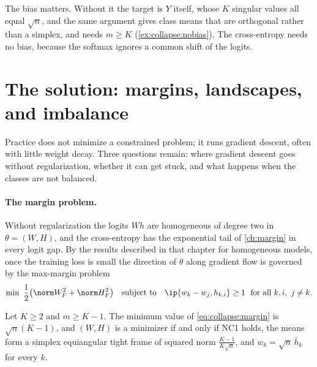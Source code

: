 \begin{refsection}
The bias matters. Without it the target is $Y$ itself, whose $K$ singular values all equal $\sqrt n$, and the same argument gives class means that are orthogonal rather than a simplex, and needs $m\ge K$ (\cref{ex:collapse:nobias}). The cross-entropy needs no bias, because the softmax ignores a common shift of the logits.

\section{The solution: margins, landscapes, and imbalance}\label{sec:collapse:dynamics}

Practice does not minimize a constrained problem; it runs gradient descent, often with little weight decay. Three questions remain: where gradient descent goes without regularization, whether it can get stuck, and what happens when the classes are not balanced.

\paragraph{The margin problem.} Without regularization the logits $Wh$ are homogeneous of degree two in $\theta=(W,H)$, and the cross-entropy has the exponential tail of \cref{ch:margin} in every logit gap. By the results described in that chapter for homogeneous models, once the training loss is small the direction of $\theta$ along gradient flow is governed by the max-margin problem
\begin{equation}\label{eq:collapse:margin}
  \min\ \frac12\bigl(\norm W_F^2+\norm H_F^2\bigr)\quad\text{subject to}\quad\ip{w_k-w_j,h_{k,i}}\ge1\ \ \text{for all }k,i,\ j\ne k .
\end{equation}

\begin{theorem}\label{thm:collapse:margin}
Let $K\ge2$ and $m\ge K-1$. The minimum value of \eqref{eq:collapse:margin} is $\sqrt n(K-1)$, and $(W,H)$ is a minimizer if and only if NC1 holds, the means form a simplex equiangular tight frame of squared norm $\frac{K-1}{K\sqrt n}$, and $w_k=\sqrt n\,\bar h_k$ for every $k$.
\end{theorem}


\end{refsection}
